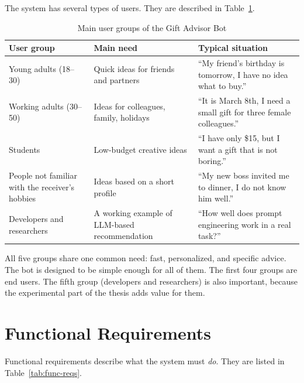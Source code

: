 The system has several types of users. They are described in Table~\ref{tab:users}.

\begin{table}[H]
\centering
\caption{Main user groups of the Gift Advisor Bot}
\label{tab:users}
\begin{tabular}{p{3cm} p{4.5cm} p{6cm}}
\toprule
\textbf{User group} & \textbf{Main need} & \textbf{Typical situation} \\
\midrule
Young adults (18--30) & Quick ideas for friends and partners & ``My friend's birthday is tomorrow, I have no idea what to buy.'' \\
Working adults (30--50) & Ideas for colleagues, family, holidays & ``It is March 8th, I need a small gift for three female colleagues.'' \\
Students & Low-budget creative ideas & ``I have only \$15, but I want a gift that is not boring.'' \\
People not familiar with the receiver's hobbies & Ideas based on a short profile & ``My new boss invited me to dinner, I do not know him well.'' \\
Developers and researchers & A working example of LLM-based recommendation & ``How well does prompt engineering work in a real task?'' \\
\bottomrule
\end{tabular}
\end{table}

All five groups share one common need: fast, personalized, and specific advice. The bot is designed to be simple enough for all of them. The first four groups are end users. The fifth group (developers and researchers) is also important, because the experimental part of the thesis adds value for them.

\section{Functional Requirements}
\label{sec:func-reqs}

Functional requirements describe what the system must \textit{do}. They are listed in Table~\ref{tab:func-reqs}.

